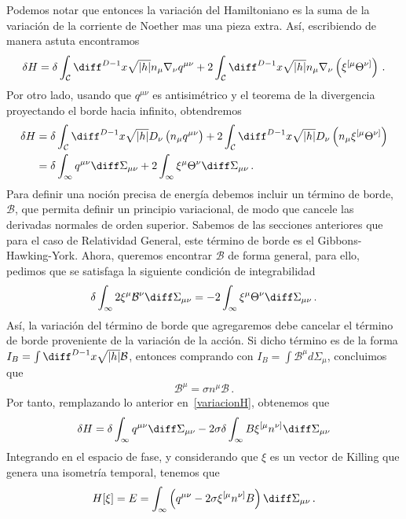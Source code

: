 \documentclass[../Main.tex]{subfiles}
\begin{document}
Podemos notar que entonces la variación del Hamiltoniano es la suma de la variación de la corriente de Noether mas una pieza extra. Así, escribiendo de manera astuta encontramos
\begin{align}
\delta H=\delta \int_{\mathcal{C}} \diff^{D-1} x \sqrt{|h|} n_\mu \nabla_\nu q^{\mu\nu}+2 \int_{\mathcal{C}} \diff^{D-1} x \sqrt{|h|} n_\mu \nabla_\nu\left(\xi^{[\mu} \Theta^{\nu]}\right)\, .
\end{align}
Por otro lado, usando que $q^{\mu\nu}$ es antisimétrico y el teorema de la divergencia proyectando el borde hacia infinito, obtendremos
\begin{align}\notag
\delta H &=\delta \int_{\mathcal{C}} \diff^{D-1} x \sqrt{|h|} D_\nu\left(n_\mu q^{\mu\nu}\right)+2 \int_{\mathcal{C}} \diff^{D-1}x \sqrt{|h|} D_\nu\left(n_\mu \xi^{[\mu} \Theta^{\nu]}\right)\\
    &=\delta \int_{\infty} q^{\mu\nu} \diff\Sigma_{\mu\nu}+2 \int_{\infty} \xi^\mu \Theta^\nu \diff\Sigma_{\mu\nu}\, . \label{variacionH}
\end{align}
Para definir una noción precisa de energía debemos incluir un término de borde, $\mathcal{B}$, que permita definir un principio variacional, de modo que cancele las derivadas normales de orden superior. Sabemos de las secciones anteriores que para el caso de Relatividad General, este término de borde es el Gibbons-Hawking-York. Ahora, queremos encontrar $\mathcal{B}$ de forma general, para ello, pedimos que se satisfaga la siguiente condición de integrabilidad 
\begin{align}
\delta \int_{\infty} 2 \xi^\mu \mathcal{B}^\nu \diff\Sigma_{\mu \nu}=-2 \int_{\infty} \xi^\mu \Theta^\nu \diff\Sigma_{\mu\nu}\, .
\end{align}
Así, la variación del término de borde que agregaremos debe cancelar el término de borde proveniente de la variación de la acción. Si dicho término es de la forma $I_{B}=\int \diff^{D-1 }x \sqrt{|h|}\mathcal{B}$, entonces comprando con $I_{B}=\int \mathcal{B}^{\mu}d\Sigma_\mu$, concluimos que 
\begin{align}
\mathcal{B}^\mu=\sigma n^\mu \mathcal{B} \, .
\end{align}
Por tanto, remplazando lo anterior en~\eqref{variacionH}, obtenemos que 
\begin{align}
\delta H=\delta \int_{\infty} q^{\mu \nu} \diff\Sigma_{\mu\nu}-2 \sigma \delta \int_{\infty} B \xi^{[\mu} n^{\nu]} \diff \Sigma_{\mu \nu}
\end{align}
Integrando en el espacio de fase, y considerando que $\xi$ es un vector de Killing que genera una isometría temporal, tenemos que 
\begin{align}
H[\xi]=E=\int_{\infty}\left(q^{\mu\nu}-2 \sigma \xi^{[\mu} n^{\nu]} B\right) \diff\Sigma_{\mu\nu}\, .
\end{align}
\end{document}
